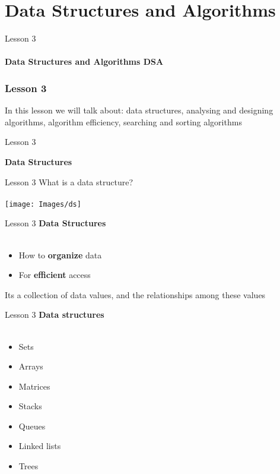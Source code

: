 \documentclass[aspectratio=1610]{beamer}
\begin{document}
\section{Data Structures and Algorithms}

\begin{frame}
\begin{center}
\Huge Lesson 3\\~\\
\textbf{Data Structures and Algorithms DSA}
\end{center}
\end{frame}



\begin{frame}
\frametitle{Lesson 3}

\Huge In this lesson we will talk about:
 \alert{data structures, analysing and designing algorithms, algorithm efficiency, searching and sorting algorithms}
\end{frame}



\begin{frame}{Lesson 3}{}
\begin{center}
\Huge \textbf{Data Structures}
\end{center}
\end{frame}


\begin{frame}{Lesson 3}{}
\Huge{What is a data structure?}\\~\\
\texttt{[image: Images/ds]}
\end{frame}


\begin{frame}{Lesson 3}{}
\LARGE
\textbf{Data Structures}\\~\\
\begin{itemize}
    \item How to \textbf{organize} data
    \item For \textbf{efficient} access
\end{itemize}

Its a collection of data values, and the relationships among these values
\end{frame}


\begin{frame}{Lesson 3}{}
\LARGE
\textbf{Data structures}\\~\\
\begin{itemize}
    \item Sets
    \item Arrays
    \item Matrices
    \item Stacks
    \item Queues
    \item Linked lists
    \item Trees
\end{itemize}
\end{frame}
\end{document}
